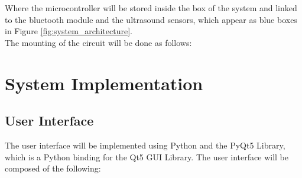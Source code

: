 \documentclass[12pt]{article}
\numberwithin{equation}{section}
\begin{document}
Where the microcontroller will be stored inside the box of the system and linked to the bluetooth module and the ultrasound sensors, which appear as blue boxes in Figure \ref{fig:system_architecture}.\\
The mounting of the circuit will be done as follows:


\section{System Implementation}
\subsection{User Interface}
The user interface will be implemented using Python and the PyQt5 Library, which is a Python binding for the Qt5 GUI Library. The user interface will be composed of the following:
\end{document}
